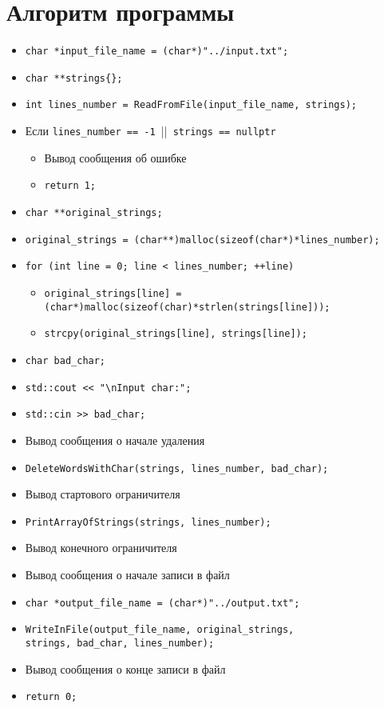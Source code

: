 \section*{Алгоритм программы}

\begin{itemize}
    \item \verb|char *input_file_name = (char*)"../input.txt";|
    \item \verb|char **strings{};|
    \item \verb|int lines_number = ReadFromFile(input_file_name, strings);|
    \item Если \verb|lines_number == -1 |||\verb| strings == nullptr|
        \begin{itemize}
            \item Вывод сообщения об ошибке
            \item \verb|return 1;|
        \end{itemize}
    \item \verb|char **original_strings;|
    \item \verb|original_strings = (char**)malloc(sizeof(char*)*lines_number);|
    \item \verb|for (int line = 0; line < lines_number; ++line)|
        \begin{itemize}
            \item \verb|original_strings[line] = |\\
            \verb|(char*)malloc(sizeof(char)*strlen(strings[line]));|
            \item \verb|strcpy(original_strings[line], strings[line]);|
        \end{itemize}
    \item \verb|char bad_char;|
    \item \verb|std::cout << "\nInput char:";|
    \item \verb|std::cin >> bad_char;|
    \item Вывод сообщения о начале удаления
    \item \verb|DeleteWordsWithChar(strings, lines_number, bad_char);|
    \item Вывод стартового ограничителя
    \item \verb|PrintArrayOfStrings(strings, lines_number);|
    \item Вывод конечного ограничителя
    \item Вывод сообщения о начале записи в файл
    \item \verb|char *output_file_name = (char*)"../output.txt";|
    \item \verb|WriteInFile(output_file_name, original_strings,|\\
    \verb|strings, bad_char, lines_number);|
    \item Вывод сообщения о конце записи в файл
    \item \verb|return 0;|
\end{itemize}
